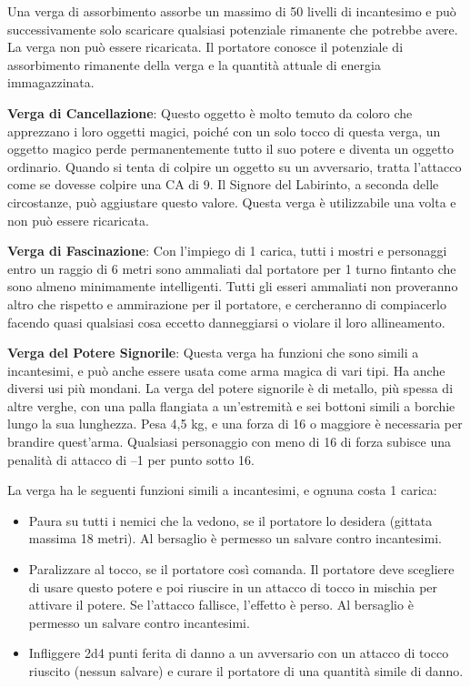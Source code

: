 \documentclass{article}
\begin{document}
\begin{multicols}{2}
Una verga di assorbimento assorbe un massimo di 50 livelli di incantesimo e può successivamente solo scaricare qualsiasi potenziale rimanente che potrebbe avere. La verga non può essere ricaricata. Il portatore conosce il potenziale di assorbimento rimanente della verga e la quantità attuale di energia immagazzinata.

\textbf{Verga di Cancellazione}: Questo oggetto è molto temuto da coloro che apprezzano i loro oggetti magici, poiché con un solo tocco di questa verga, un oggetto magico perde permanentemente tutto il suo potere e diventa un oggetto ordinario. Quando si tenta di colpire un oggetto su un avversario, tratta l'attacco come se dovesse colpire una CA di 9. Il Signore del Labirinto, a seconda delle circostanze, può aggiustare questo valore. Questa verga è utilizzabile una volta e non può essere ricaricata.

\textbf{Verga di Fascinazione}: Con l'impiego di 1 carica, tutti i mostri e personaggi entro un raggio di 6 metri sono ammaliati dal portatore per 1 turno fintanto che sono almeno minimamente intelligenti. Tutti gli esseri ammaliati non proveranno altro che rispetto e ammirazione per il portatore, e cercheranno di compiacerlo facendo quasi qualsiasi cosa eccetto danneggiarsi o violare il loro allineamento.

\textbf{Verga del Potere Signorile}: Questa verga ha funzioni che sono simili a incantesimi, e può anche essere usata come arma magica di vari tipi. Ha anche diversi usi più mondani. La verga del potere signorile è di metallo, più spessa di altre verghe, con una palla flangiata a un'estremità e sei bottoni simili a borchie lungo la sua lunghezza. Pesa 4,5 kg, e una forza di 16 o maggiore è necessaria per brandire quest'arma. Qualsiasi personaggio con meno di 16 di forza subisce una penalità di attacco di –1 per punto sotto 16.

La verga ha le seguenti funzioni simili a incantesimi, e ognuna costa 1 carica:
\begin{itemize}
\item Paura su tutti i nemici che la vedono, se il portatore lo desidera (gittata massima 18 metri). Al bersaglio è permesso un salvare contro incantesimi.
\item Paralizzare al tocco, se il portatore così comanda. Il portatore deve scegliere di usare questo potere e poi riuscire in un attacco di tocco in mischia per attivare il potere. Se l'attacco fallisce, l'effetto è perso. Al bersaglio è permesso un salvare contro incantesimi.
\item Infliggere 2d4 punti ferita di danno a un avversario con un attacco di tocco riuscito (nessun salvare) e curare il portatore di una quantità simile di danno.
\end{itemize}


\end{multicols}
\end{document}
